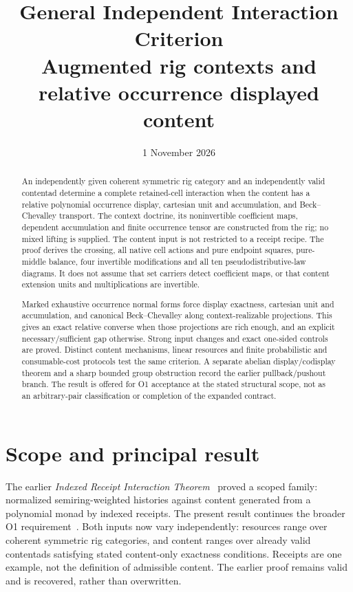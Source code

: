 \documentclass[11pt,a4paper]{article}
\title{General Independent Interaction Criterion\\[5pt]
\large Augmented rig contexts and relative occurrence displayed content}
\date{1 November 2026}
\theoremstyle{definition}
\begin{document}
\maketitle

\begin{abstract}
An independently given coherent symmetric rig category and an independently
valid contentad determine a complete retained-cell interaction when the content
has a relative polynomial occurrence display, cartesian unit and accumulation,
and Beck--Chevalley transport. The context doctrine, its noninvertible
coefficient maps, dependent accumulation and finite occurrence tensor are
constructed from the rig; no mixed lifting is supplied. The content input is
not restricted to a receipt recipe. The proof derives the crossing, all native
cell actions and pure endpoint squares, pure-middle balance, four invertible
modifications and all ten pseudodistributive-law diagrams. It does not assume
that set carriers detect coefficient maps, or that content extension units and
multiplications are invertible.

Marked exhaustive occurrence normal forms force display exactness, cartesian
unit and accumulation, and canonical Beck--Chevalley along context-realizable
projections. This gives an exact relative converse when those projections are
rich enough, and an explicit necessary/sufficient gap otherwise. Strong input
changes and exact one-sided controls are proved. Distinct content mechanisms,
linear resources and finite probabilistic and consumable-cost protocols test
the same criterion. A separate abelian display/codisplay theorem and a sharp
bounded group obstruction record the earlier pullback/pushout branch.
The result is offered for O1 acceptance at the stated structural scope, not as
an arbitrary-pair classification or completion of the expanded contract.
\end{abstract}

\tableofcontents

\section{Scope and principal result}\label{sec:scope}

The earlier \emph{Indexed Receipt Interaction Theorem}~\cite{Receipt} proved a
scoped family: normalized semiring-weighted histories against content generated
from a polynomial monad by indexed receipts. The present result continues the
broader O1 requirement~\cite{Contract}. Both inputs now vary independently:
resources range over coherent symmetric rig categories, and content ranges over
already valid contentads satisfying stated content-only exactness conditions.
Receipts are one example, not the definition of admissible content. The earlier
proof remains valid and is recovered, rather than overwritten.
\end{document}
